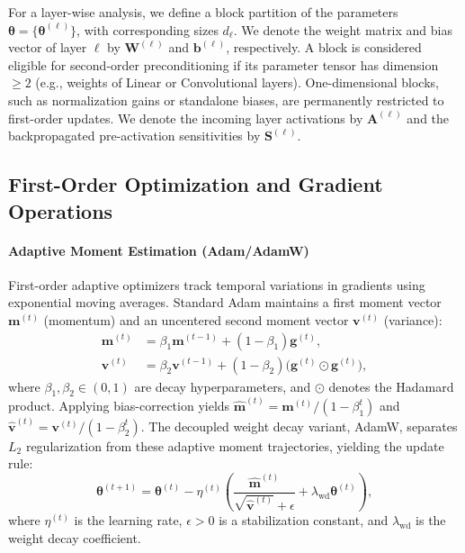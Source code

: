 \documentclass[conference]{IEEEtran}
\begin{document}
For a layer-wise analysis, we define a block partition of the parameters $\boldsymbol{\theta} = \{\boldsymbol{\theta}^{(\ell)}\}$, with corresponding sizes $d_\ell$. We denote the weight matrix and bias vector of layer $\ell$ by $\mathbf{W}^{(\ell)}$ and $\mathbf{b}^{(\ell)}$, respectively. A block is considered eligible for second-order preconditioning if its parameter tensor has dimension $\ge 2$ (e.g., weights of Linear or Convolutional layers). One-dimensional blocks, such as normalization gains or standalone biases, are permanently restricted to first-order updates. We denote the incoming layer activations by $\mathbf{A}^{(\ell)}$ and the backpropagated pre-activation sensitivities by $\mathbf{S}^{(\ell)}$.

\subsection{First-Order Optimization and Gradient Operations}
\label{subsec:first_order_bg}

\paragraph{Adaptive Moment Estimation (Adam/AdamW)} First-order adaptive optimizers track temporal variations in gradients using exponential moving averages. Standard Adam maintains a first moment vector $\mathbf{m}^{(t)}$ (momentum) and an uncentered second moment vector $\mathbf{v}^{(t)}$ (variance):
\begin{align}
\mathbf{m}^{(t)} &= \beta_1 \mathbf{m}^{(t-1)} + (1-\beta_1)\mathbf{g}^{(t)}, \\
\mathbf{v}^{(t)} &= \beta_2 \mathbf{v}^{(t-1)} + (1-\beta_2)\bigl(\mathbf{g}^{(t)} \odot \mathbf{g}^{(t)}\bigr),
\label{eq:moments}
\end{align}
where $\beta_1, \beta_2 \in (0, 1)$ are decay hyperparameters, and $\odot$ denotes the Hadamard product. Applying bias-correction yields $\hat{\mathbf{m}}^{(t)} = \mathbf{m}^{(t)} / (1-\beta_1^t)$ and $\hat{\mathbf{v}}^{(t)} = \mathbf{v}^{(t)} / (1-\beta_2^t)$. The decoupled weight decay variant, AdamW, separates $L_2$ regularization from these adaptive moment trajectories, yielding the update rule:
\begin{equation}
\boldsymbol{\theta}^{(t+1)} = \boldsymbol{\theta}^{(t)} - \eta^{(t)} \left( \frac{\hat{\mathbf{m}}^{(t)}}{\sqrt{\hat{\mathbf{v}}^{(t)}}+\epsilon} + \lambda_{\mathrm{wd}}\boldsymbol{\theta}^{(t)} \right),
\label{eq:adamw_update}
\end{equation}
where $\eta^{(t)}$ is the learning rate, $\epsilon > 0$ is a stabilization constant, and $\lambda_{\mathrm{wd}}$ is the weight decay coefficient.
\end{document}
